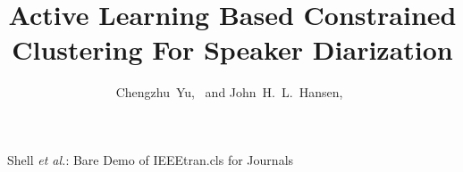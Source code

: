 \documentclass[journal]{IEEEtran}
\begin{document}
%
\title{Active Learning Based Constrained Clustering For Speaker Diarization}
%
%
%

\author{Chengzhu~Yu,~
        and John~H.~L.~Hansen,~}%

% 
%



{Shell \MakeLowercase{\textit{et al.}}: Bare Demo of IEEEtran.cls for Journals}
% 
\end{document}

